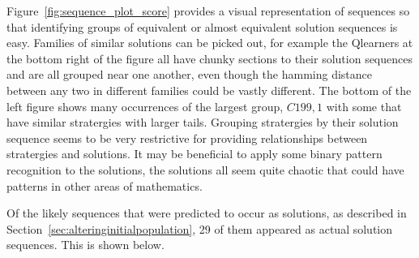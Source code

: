 Figure~\ref{fig:sequence_plot_score} provides a visual representation of sequences so that identifying groups of equivalent or almost equivalent solution sequences is easy.
Families of similar solutions can be picked out, for example the Qlearners at the bottom right of the figure all have chunky sections to their solution sequences and are all grouped near one another, even though the hamming distance between any two in different families could be vastly different.
The bottom of the left figure shows many occurrences of the largest group, $C199,1$ with some that have similar stratergies with larger tails.
Grouping stratergies by their solution sequence seems to be very restrictive for providing relationships between stratergies and solutions. 
It may be beneficial to apply some binary pattern recognition to the solutions, the solutions all seem quite chaotic that could have patterns in other areas of mathematics.

Of the likely sequences that were predicted to occur as solutions, as described in Section~\ref{sec:alteringinitialpopulation}, 29 of them appeared as actual solution sequences. 
This is shown below.

